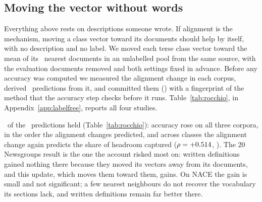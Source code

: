 \documentclass[11pt]{article}
\begin{document}
\subsection{Moving the vector without words}
\label{sec:rocchio}

Everything above rests on descriptions someone wrote. If alignment is the
mechanism, moving a class vector toward its documents should help by itself,
with no description and no label. We moved each terse class vector toward the
mean of its \RocchioK\ nearest documents in an unlabelled pool from the same
source, with the evaluation documents removed and both settings fixed in
advance. Before any accuracy was computed we measured the alignment change in
each corpus, derived \RocchioPredictions\ predictions from it, and committed them
(\RocchioRegistered) with a fingerprint of the method that the accuracy step
checks before it runs. Table~\ref{tab:rocchio}, in
Appendix~\ref{app:labelfree}, reports all four studies.

\RocchioHeld\ of the \RocchioPredictions\ predictions held
(Table~\ref{tab:rocchio}): accuracy rose on all three corpora, in the order the
alignment changes predicted, and across classes the alignment change
again predicts the share of headroom captured ($\rho = +0.514$,
\RocchioRhoPStat). The 20 Newsgroups result is the one the account risked most
on: written definitions gained nothing there because they moved its vectors
away from its documents, and this update, which moves them toward them, gains.
On NACE the gain is small and not significant; a few nearest neighbours do not
recover the vocabulary its sections lack, and written definitions remain far
better there.
\end{document}
